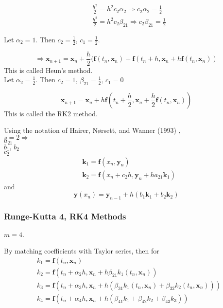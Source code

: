 \documentclass[10pt]{amsart}
\begin{document}
\begin{multicols*}{2}
\[
\begin{aligned}
	& \frac{h^2}{2} = h^2 c_2 \alpha_2 \Longrightarrow c_2\alpha_2 = \frac{1}{2} \\
 	& \frac{h^2}{2} = h^2 c_2 \beta_{21} \Longrightarrow c_2 \beta_{21} = \frac{1}{2}
\end{aligned}
\]

Let $\alpha_2 = 1$. Then $c_2 = \frac{1}{2}$, $c_1= \frac{1}{2}$.

\[
\Longrightarrow \mathbf{x}_{n+1} = \mathbf{x}_n + \frac{h}{2} (\mathbf{f}(t_n, \mathbf{x}_n ) + \mathbf{f}(t_n + h, \mathbf{x}_n + h\mathbf{f}(t_n, \mathbf{x}_n))
\]
This is called Heun's method. \\

Let $\alpha_2 = \frac{1}{2}$. Then $c_2 = 1, \, \beta_{21} = \frac{1}{2}, \, c_1 = 0$

\[
\mathbf{x}_{n+1} = \mathbf{x}_n + h \mathbf{f}(t_n + \frac{h}{2}, \mathbf{x}_n + \frac{h}{2} \mathbf{f}(t_n, \mathbf{x}_n))
\]
This is called the RK2 method.

Using the notation of Hairer, N\o rsett, and Wanner (1993) \cite{HNW1993}, \\
$s=2 \Longrightarrow$ \\
$a_{21}$ \\
$b_1, \, b_2$ \\
$c_2$ \\

\[
\begin{aligned}
	& \mathbf{k}_1 = \mathbf{f}(x_n, \mathbf{y}_n) \\
	& \mathbf{k}_2 = \mathbf{f}(x_n + c_2h, \mathbf{y}_n + ha_{21} \mathbf{k}_1) 	
\end{aligned}
\]
and 
\[
\mathbf{y}(x_n) = \mathbf{y}_{n-1} + h(b_1 \mathbf{k}_1 + b_2 \mathbf{k}_2)
\]


\subsubsection{Runge-Kutta 4, RK4 Methods}

$m=4$.

By matching coefficients with Taylor series, then for
\begin{equation}
	\begin{aligned}
		& k_1 = \mathbf{f}(t_n, \mathbf{x}_n) \\
		& k_2 = \mathbf{f}(t_n + \alpha_2 h, \mathbf{x}_n + h \beta_{21} k_1(t_n,\mathbf{x}_n)) \\
		& k_3 = \mathbf{f}(t_n + \alpha_3 h, \mathbf{x}_n +h (\beta_{31}k_1(t_n, \mathbf{x}_n) + \beta_{32}k_2(t_n, \mathbf{x}_n)) ) \\
		& k_4 = \mathbf{f}(t_n + \alpha_4 h, \mathbf{x}_n + h(\beta_{41} k_1 + \beta_{42} k_2 + \beta_{43} k_3))
	\end{aligned}
\end{equation}


\end{multicols*}
\end{document}
